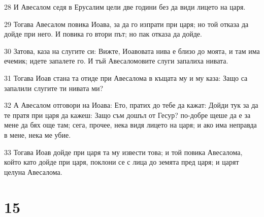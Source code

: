 \par 28 И Авесалом седя в Ерусалим цели две години без да види лицето на царя.
\par 29 Тогава Авесалом повика Иоава, за да го изпрати при царя; но той отказа да дойде при него. И повика го втори път; но пак отказа да дойде.
\par 30 Затова, каза на слугите си: Вижте, Иоавовата нива е близо до моята, и там има ечемик; идете запалете го. И тъй Авесаломовите слуги запалиха нивата.
\par 31 Тогава Иоав стана та отиде при Авесалома в къщата му и му каза: Защо са запалили слугите ти нивата ми?
\par 32 А Авесалом отговори на Иоава: Ето, пратих до тебе да кажат: Дойди тук за да те пратя при царя да кажеш: Защо съм дошъл от Гесур? по-добре щеше да е за мене да бях още там; сега, прочее, нека видя лицето на царя; и ако има неправда в мене, нека ме убие.
\par 33 Тогава Иоав дойде при царя та му извести това; и той повика Авесалома, който като дойде при царя, поклони се с лица до земята пред царя; и царят целуна Авесалома.

\chapter{15}


